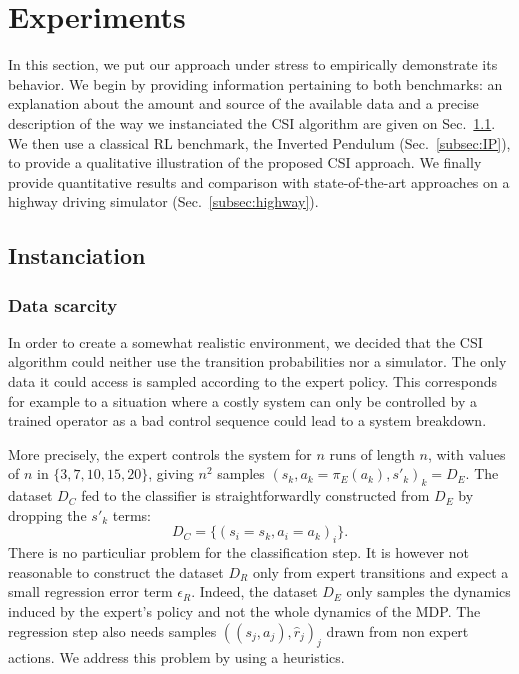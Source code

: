 \documentclass[smallextended]{svjour3}
\begin{document}
\section{Experiments}
\label{sec:experiments}
In this section, we put our approach under stress to empirically demonstrate its behavior. We begin by providing information pertaining to both benchmarks: an explanation about the amount and source of the available data and a precise description of the way we instanciated the CSI algorithm are given on Sec.~\ref{subsec:instanciation}. 
We then use a classical RL benchmark, the Inverted Pendulum (Sec.~\ref{subsec:IP}), to provide a qualitative illustration of the proposed CSI approach.
We finally provide quantitative results and comparison with state-of-the-art approaches on a highway driving simulator (Sec.~\ref{subsec:highway}).
\subsection{Instanciation}
\label{subsec:instanciation}
\subsubsection{Data scarcity}
\label{subsubsec:data}
In order to create a somewhat realistic environment, we decided that the CSI algorithm could neither use the transition probabilities nor a simulator. The only data it could access is sampled according to the expert policy. This corresponds for example to a situation where a costly system can only be controlled by a trained operator as a bad control sequence could lead to a system breakdown.

More precisely, the expert controls the system for $n$ runs of length $n$, with values of $n$ in $\{3,7,10,15,20\}$, giving $n^2$ samples $(s_k,a_k=\pi_E(a_k),s'_k)_k = D_E$. The dataset $D_C$ fed to the classifier is straightforwardly constructed from $D_E$ by dropping the $s'_k$ terms:
\begin{equation}
  D_C = \{(s_i = s_k,a_i=a_k)_i\}.
\end{equation}
There is no particuliar problem for the classification step. It is however not reasonable to construct the dataset $D_R$ only from expert transitions and expect a small regression error term $\epsilon_R$. Indeed, the dataset $D_E$ only samples the dynamics induced by the expert's policy and not the whole dynamics of the MDP. The regression step also needs samples $((s_j,a_j),\hat r_j)_j$ drawn from non expert actions. We address this problem by using a heuristics.
\end{document}
